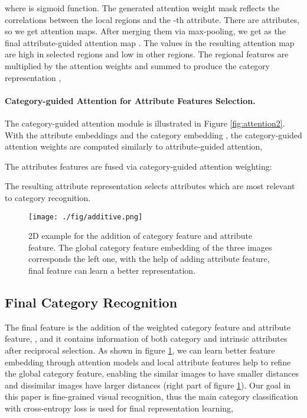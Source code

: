 \documentclass[sigconf]{acmart}
\begin{document}
 where  is sigmoid function. The generated attention weight mask  reflects the correlations between the  local regions and the -th attribute. There are  attributes, so we get  attention maps. After merging them via max-pooling, we get  as the final attribute-guided attention map . The values in the resulting attention map  are high in selected regions and low in other regions. The regional features are multiplied by the attention weights and summed to produce the category representation ,


\paragraph{Category-guided Attention for Attribute Features Selection.}
The category-guided attention module is illustrated in Figure \ref{fig:attention2}. With the  attribute embeddings  and the category embedding , the category-guided attention weights are computed similarly to attribute-guided attention,

The  attributes features are fused via category-guided attention weighting:

The resulting attribute representation  selects attributes which are most relevant to category recognition.

\begin{figure}[!htp]
\begin{center}
   \texttt{[image: ./fig/additive.png]}
\end{center}
   \caption{2D example for the addition of category feature and attribute feature. The global category feature embedding of the three images corresponds the left one, with the help of adding attribute feature, final feature can learn a better representation.}
\label{fig:additive}
\end{figure}

\subsection{Final Category Recognition}
The final feature is the addition of the weighted category feature and attribute feature, , and it contains information of both category and intrinsic attributes after reciprocal selection. As shown in figure \ref{fig:additive}, we can learn better feature embedding through attention models and local attribute features help to refine the global category feature, enabling the similar images to have smaller distances and dissimilar images have larger distances (right part of figure \ref{fig:additive}). Our goal in this paper is fine-grained visual recognition, thus the main category classification with cross-entropy loss is used for final representation learning,
\end{document}
